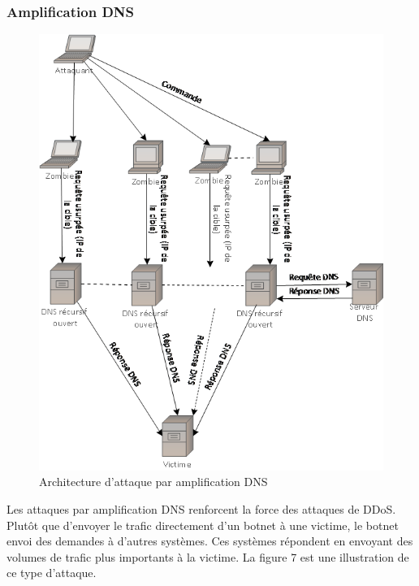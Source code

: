 	\subsubsection{Amplification DNS}
	\begin{figure}[hp]
		\begin{center}
			\includegraphics[width=\textwidth]{IMAGES/ORIGINALS/Amplification_DNS}
		\end{center}
		\caption{Architecture d'attaque par amplification DNS}
	\end{figure}	
			
	Les attaques par amplification DNS renforcent la force des attaques de DDoS. Plutôt que d’envoyer le trafic directement d’un botnet à une victime, le botnet envoi des demandes à d’autres systèmes. Ces systèmes répondent en envoyant des volumes de trafic plus importants à la victime. La figure 7 est une illustration de ce type d’attaque.
		
	
